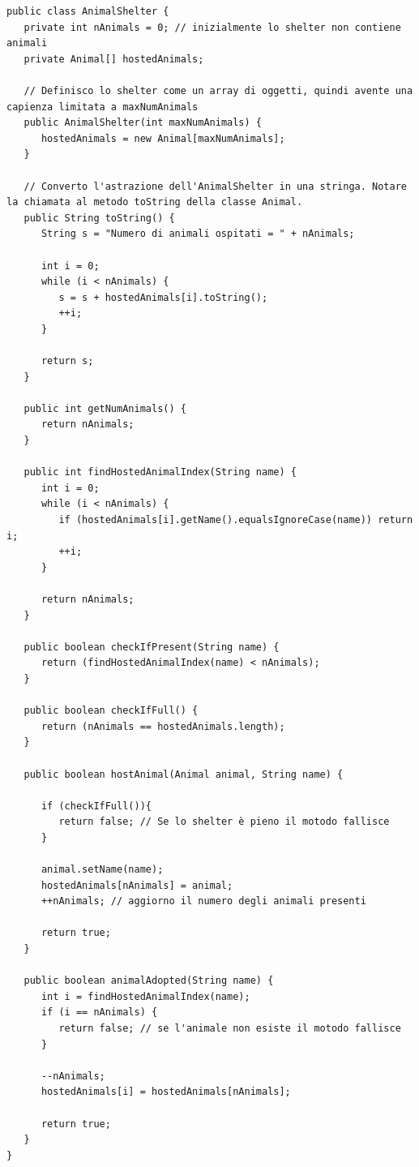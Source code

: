 \documentclass[a4paper,11pt]{article}
\begin{document}
\begin{lstlisting}[caption={AnimalShelter.java}]
public class AnimalShelter {
   private int nAnimals = 0; // inizialmente lo shelter non contiene animali
   private Animal[] hostedAnimals;

   // Definisco lo shelter come un array di oggetti, quindi avente una capienza limitata a maxNumAnimals
   public AnimalShelter(int maxNumAnimals) {
      hostedAnimals = new Animal[maxNumAnimals];
   }

   // Converto l'astrazione dell'AnimalShelter in una stringa. Notare la chiamata al metodo toString della classe Animal.
   public String toString() {
      String s = "Numero di animali ospitati = " + nAnimals;

      int i = 0;
      while (i < nAnimals) {
         s = s + hostedAnimals[i].toString();
         ++i;
      }

      return s;
   }

   public int getNumAnimals() {
      return nAnimals;
   }

   public int findHostedAnimalIndex(String name) {
      int i = 0;
      while (i < nAnimals) {
         if (hostedAnimals[i].getName().equalsIgnoreCase(name)) return i;
         ++i;
      }

      return nAnimals;
   }

   public boolean checkIfPresent(String name) {
      return (findHostedAnimalIndex(name) < nAnimals);
   }

   public boolean checkIfFull() {
      return (nAnimals == hostedAnimals.length);
   }

   public boolean hostAnimal(Animal animal, String name) {

      if (checkIfFull()){
         return false; // Se lo shelter è pieno il motodo fallisce
      }

      animal.setName(name);
      hostedAnimals[nAnimals] = animal;
      ++nAnimals; // aggiorno il numero degli animali presenti

      return true;
   }

   public boolean animalAdopted(String name) {
      int i = findHostedAnimalIndex(name);
      if (i == nAnimals) {
         return false; // se l'animale non esiste il motodo fallisce
      }

      --nAnimals;
      hostedAnimals[i] = hostedAnimals[nAnimals];

      return true;
   }
}
\end{lstlisting}
\end{document}
